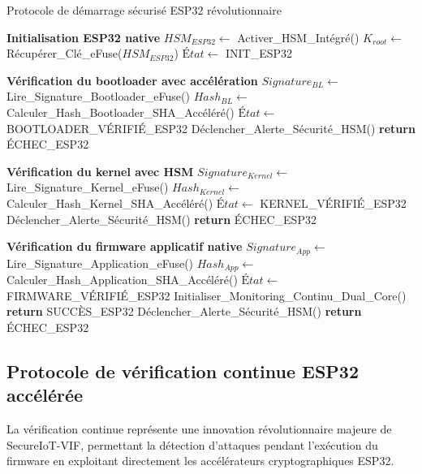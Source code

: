 \begin{algorithm}
\caption{Protocole de démarrage sécurisé ESP32 révolutionnaire}
\label{alg:secure-boot-esp32}
\begin{algorithmic}[1]
\State \textbf{Initialisation ESP32 native}
\State $HSM_{ESP32} \leftarrow$ Activer\_HSM\_Intégré()
\State $K_{root} \leftarrow$ Récupérer\_Clé\_eFuse($HSM_{ESP32}$)
\State $État \leftarrow$ INIT\_ESP32

\State \textbf{Vérification du bootloader avec accélération}
\State $Signature_{BL} \leftarrow$ Lire\_Signature\_Bootloader\_eFuse()
\State $Hash_{BL} \leftarrow$ Calculer\_Hash\_Bootloader\_SHA\_Accéléré()
    \State $État \leftarrow$ BOOTLOADER\_VÉRIFIÉ\_ESP32
\Else
    \State Déclencher\_Alerte\_Sécurité\_HSM()
    \State \textbf{return} ÉCHEC\_ESP32
\EndIf

\State \textbf{Vérification du kernel avec HSM}
\State $Signature_{Kernel} \leftarrow$ Lire\_Signature\_Kernel\_eFuse()
\State $Hash_{Kernel} \leftarrow$ Calculer\_Hash\_Kernel\_SHA\_Accéléré()
    \State $État \leftarrow$ KERNEL\_VÉRIFIÉ\_ESP32
\Else
    \State Déclencher\_Alerte\_Sécurité\_HSM()
    \State \textbf{return} ÉCHEC\_ESP32
\EndIf

\State \textbf{Vérification du firmware applicatif native}
\State $Signature_{App} \leftarrow$ Lire\_Signature\_Application\_eFuse()
\State $Hash_{App} \leftarrow$ Calculer\_Hash\_Application\_SHA\_Accéléré()
    \State $État \leftarrow$ FIRMWARE\_VÉRIFIÉ\_ESP32
    \State Initialiser\_Monitoring\_Continu\_Dual\_Core()
    \State \textbf{return} SUCCÈS\_ESP32
\Else
    \State Déclencher\_Alerte\_Sécurité\_HSM()
    \State \textbf{return} ÉCHEC\_ESP32
\EndIf
\end{algorithmic}
\end{algorithm}

\subsection{Protocole de vérification continue ESP32 accélérée}

La vérification continue représente une innovation révolutionnaire majeure de SecureIoT-VIF, permettant la détection d'attaques pendant l'exécution du firmware en exploitant directement les accélérateurs cryptographiques ESP32.

